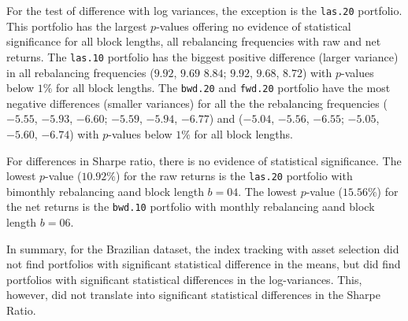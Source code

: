 \documentclass[12pt,oneside,a4paper]{memoir}
\begin{document}
For the test of difference with log variances, the exception is the \texttt{las.20} portfolio.
This portfolio has the largest $p$-values offering no evidence of statistical significance for all block lengths, all rebalancing frequencies with raw and net returns.
The \texttt{las.10} portfolio has the biggest positive difference (larger variance) in all rebalancing frequencies ($9.92$, $9.69$ $8.84$; $9.92$, $9.68$, $8.72$) with $p$-values below $1\%$ for all block lengths.
The \texttt{bwd.20} and \texttt{fwd.20} portfolio have the most negative differences (smaller variances) for all the the rebalancing frequencies
($-5.55$, $-5.93$, $-6.60$; $-5.59$, $-5.94$, $-6.77$) and 
($-5.04$, $-5.56$, $-6.55$; $-5.05$, $-5.60$, $-6.74$)
with $p$-values below $1\%$ for all block lengths.

For differences in Sharpe ratio, there is no evidence of statistical significance.
The lowest $p$-value ($10.92\%$) for the raw returns is the \texttt{las.20} portfolio with bimonthly rebalancing aand block length $b=04$.
The lowest $p$-value ($15.56\%$) for the net returns is the \texttt{bwd.10} portfolio with monthly rebalancing aand block length $b=06$.

In summary, for the Brazilian dataset, the index tracking with asset selection did not find portfolios with significant statistical difference in the means, but did find portfolios with significant statistical differences in the log-variances. This, however, did not translate into significant statistical differences in the Sharpe Ratio.

\end{document}
